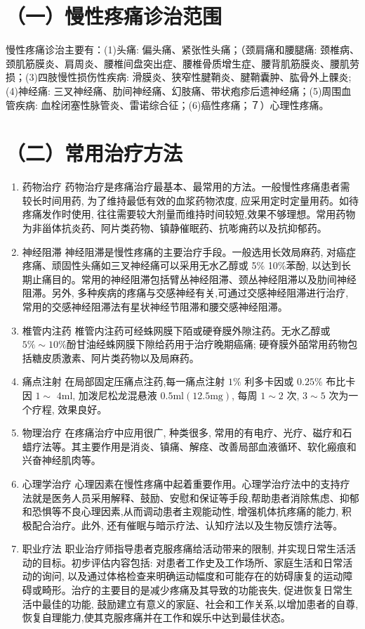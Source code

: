 \documentclass[10pt]{article}
\begin{document}
\section*{（一）慢性疼痛诊治范围}
慢性疼痛诊治主要有：(1)头痛: 偏头痛、紧张性头痛；（颈肩痛和腰腿痛: 颈椎病、颈肌筋膜炎、肩周炎、腰椎间盘突出症、腰椎骨质增生症、腰背肌筋膜炎、腰肌劳损；(3)四肢慢性损伤性疾病: 滑膜炎、狭窄性腱鞘炎、腱鞘囊肿、肱骨外上髁炎; (4)神经痛: 三叉神经痛、肋间神经痛、幻肢痛、带状疱疹后遗神经痛；(5)周围血管疾病: 血栓闭塞性脉管炎、雷诺综合征；(6)癌性疼痛；７）心理性疼痛。

\section*{（二）常用治疗方法}
\begin{enumerate}
  \item 药物治疗 药物治疗是疼痛治疗最基本、最常用的方法。一般慢性疼痛患者需较长时间用药, 为了维持最低有效的血浆药物浓度, 应采用定时定量用药。如待疼痛发作时使用, 往往需要较大剂量而维持时间较短,效果不够理想。常用药物为非甾体抗炎药、阿片类药物、镇静催眠药、抗嘭痈药以及抗抑郁药。

  \item 神经阻滞 神经阻滞是慢性疼痛的主要治疗手段。一般选用长效局麻药, 对癌症疼痛、顽固性头痛如三叉神经痛可以采用无水乙醇或 5\% 10\%苯酚, 以达到长期止痛目的。常用的神经阻滞包括臂丛神经阻滞、颈丛神经阻滞以及肋间神经阻滞。另外, 多种疾病的疼痛与交感神经有关,可通过交感神经阻滞进行治疗, 常用的交感神经阻滞法有星状神经节阻滞和腰交感神经阻滞。

  \item 椎管内注药 椎管内注药可经蛛网膜下陌或硬脊膜外隙注药。无水乙醇或 $5 \% \sim 10 \%$酚甘油经蛛网膜下隙给药用于治疗晚期癌痛; 硬脊膜外皕常用药物包括糖皮质激素、阿片类药物以及局麻药。

  \item 痛点注射 在局部固定压痛点注药,每一痛点注射 $1 \%$ 利多卡因或 $0.25 \%$ 布比卡因 $1 \sim$ $4 \mathrm{ml}$, 加泼尼松龙混悬液 $0.5 \mathrm{ml}(12.5 \mathrm{mg})$, 每周 $1 \sim 2$ 次, $3 \sim 5$ 次为一个疗程, 效果良好。

  \item 物理治疗 在疼痛治疗中应用很广, 种类很多, 常用的有电疗、光疗、磁疗和石蜡疗法等。其主要作用是消炎、镇痛、解痉、改善局部血液循环、软化瘢痕和兴奋神经肌肉等。

  \item 心理学治疗 心理因素在慢性疼痛中起着重要作用。心理学治疗法中的支持疗法就是医务人员采用解释、鼓励、安慰和保证等手段,帮助患者消除焦虑、抑郁和恐惧等不良心理因素,从而调动患者主观能动性, 增强机体抗疼痛的能力, 积极配合治疗。此外, 还有催眠与暗示疗法、认知疗法以及生物反馈疗法等。

  \item 职业疗法 职业治疗师指导患者克服疼痛给活动带来的限制, 并实现日常生活活动的目标。初步评估内容包括: 对患者工作史及工作场所、家庭生活和日常活动的询问, 以及通过体格检查来明确运动幅度和可能存在的妨碍康复的运动障碍或畸形。治疗的主要目的是减少疼痛及其导致的功能丧失, 促进恢复日常生活中最佳的功能, 鼓励建立有意义的家庭、社会和工作关系,以增加患者的自尊,恢复自理能力,使其克服疼痛并在工作和娱乐中达到最佳状态。

\end{enumerate}
\end{document}
